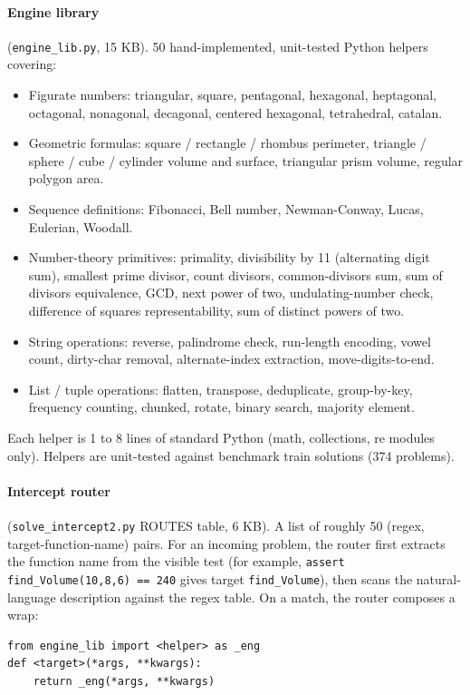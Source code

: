 \documentclass[11pt,a4paper]{article}
\begin{document}
\paragraph{Engine library} (\texttt{engine\_lib.py}, 15 KB). 50 hand-implemented, unit-tested Python helpers covering:

\begin{itemize}
\item Figurate numbers: triangular, square, pentagonal, hexagonal, heptagonal, octagonal, nonagonal, decagonal, centered hexagonal, tetrahedral, catalan.
\item Geometric formulas: square / rectangle / rhombus perimeter, triangle / sphere / cube / cylinder volume and surface, triangular prism volume, regular polygon area.
\item Sequence definitions: Fibonacci, Bell number, Newman-Conway, Lucas, Eulerian, Woodall.
\item Number-theory primitives: primality, divisibility by 11 (alternating digit sum), smallest prime divisor, count divisors, common-divisors sum, sum of divisors equivalence, GCD, next power of two, undulating-number check, difference of squares representability, sum of distinct powers of two.
\item String operations: reverse, palindrome check, run-length encoding, vowel count, dirty-char removal, alternate-index extraction, move-digits-to-end.
\item List / tuple operations: flatten, transpose, deduplicate, group-by-key, frequency counting, chunked, rotate, binary search, majority element.
\end{itemize}

Each helper is 1 to 8 lines of standard Python (math, collections, re modules only). Helpers are unit-tested against benchmark train solutions (374 problems).

\paragraph{Intercept router} (\texttt{solve\_intercept2.py} ROUTES table, 6 KB). A list of roughly 50 (regex, target-function-name) pairs. For an incoming problem, the router first extracts the function name from the visible test (for example, \texttt{assert find\_Volume(10,8,6) == 240} gives target \texttt{find\_Volume}), then scans the natural-language description against the regex table. On a match, the router composes a wrap:

\begin{lstlisting}
from engine_lib import <helper> as _eng
def <target>(*args, **kwargs):
    return _eng(*args, **kwargs)
\end{lstlisting}
\end{document}
